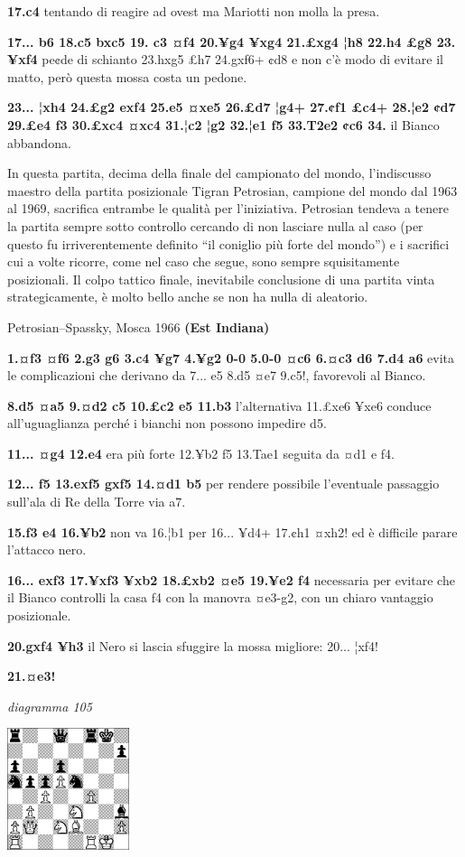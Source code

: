 \documentclass[
]{article}
\begin{document}
\textbf{17.c4} tentando di reagire ad ovest ma Mariotti non molla la
presa.

\textbf{17... b6 18.c5 bxc5 19. c3 ¤f4 20.¥g4 ¥xg4 21.£xg4 ¦h8 22.h4 £g8
23. ¥xf4} pe¢de di schianto 23.hxg5 £h7 24.gxf6+ ¢d8 e non c'è modo di
evitare il matto, però questa mossa costa un pedone.

\textbf{23... ¦xh4 24.£g2 exf4 25.e5 ¤xe5 26.£d7 ¦g4+ 27.¢f1 £c4+ 28.¦e2
¢d7 29.£e4 f3 30.£xc4 ¤xc4 31.¦c2 ¦g2 32.¦e1 f5 33.T2e2 ¢c6 34.} il
Bianco abbandona.

In questa partita, decima della finale del campionato del mondo,
l'indiscusso maestro della partita posizionale Tigran Petrosian,
campione del mondo dal 1963 al 1969, sacrifica entrambe le qualità per
l'iniziativa. Petrosian tendeva a tenere la partita sempre sotto
controllo cercando di non lasciare nulla al caso (per questo fu
irriverentemente definito ``il coniglio più forte del mondo'') e i
sacrifici cui a volte ricorre, come nel caso che segue, sono sempre
squisitamente posizionali. Il colpo tattico finale, inevitabile
conclusione di una partita vinta strategicamente, è molto bello anche se
non ha nulla di aleatorio.

Petrosian--Spassky, Mosca 1966 \textbf{(Est Indiana)}

\textbf{1.¤f3 ¤f6 2.g3 g6 3.c4 ¥g7 4.¥g2 0-0 5.0-0 ¤c6 6.¤c3 d6 7.d4 a6}
evita le complicazioni che derivano da 7... e5 8.d5 ¤e7 9.c5!,
favorevoli al Bianco.

\textbf{8.d5 ¤a5 9.¤d2 c5 10.£c2 e5 11.b3} l'alternativa 11.£xe6 ¥xe6
conduce all'uguaglianza perché i bianchi non possono impedire d5.

\textbf{11... ¤g4 12.e4} era più forte 12.¥b2 f5 13.Tae1 seguita da ¤d1
e f4.

\textbf{12... f5 13.exf5 gxf5 14.¤d1 b5} per rendere possibile
l'eventuale passaggio sull'ala di Re della Torre via a7.

\textbf{15.f3 e4 16.¥b2} non va 16.¦b1 per 16... ¥d4+ 17.¢h1 ¤xh2! ed è
difficile parare l'attacco nero.

\textbf{16... exf3 17.¥xf3 ¥xb2 18.£xb2 ¤e5 19.¥e2 f4} necessaria per
evitare che il Bianco controlli la casa f4 con la manovra ¤e3-g2, con un
chiaro vantaggio posizionale.

\textbf{20.gxf4 ¥h3} il Nero si lascia sfuggire la mossa migliore: 20...
¦xf4!

\textbf{21.¤e3!}

\emph{diagramma 105}

\includegraphics[width=1.40139in,height=1.40139in]{vertopal_109f12be458a423d8f3cc838880eaea2/media/image105.png}
\end{document}
